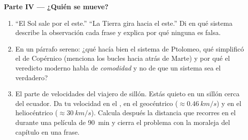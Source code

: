 \begin{problem}
\medskip
\noindent\textbf{Parte IV --- ¿Quién se mueve?}
\begin{enumerate}[resume]
  \item ``El Sol sale por el este.'' ``La Tierra gira hacia el este.''
        Di en qué sistema describe la observación cada frase y explica
        por qué ninguna es falsa.
  \item En un párrafo sereno: ¿qué hacía bien el sistema de Ptolomeo,
        qué simplificó el de Copérnico (menciona los bucles hacia atrás
        de Marte) y por qué el veredicto moderno habla de
        \emph{comodidad} y no de que un sistema sea el verdadero?
  \item El parte de velocidades del viajero de sillón. Estás quieto en
        un sillón cerca del ecuador. Da tu velocidad en el , en el geocéntrico ($\approx \qty{0.46}{km/s}$) y en
        el heliocéntrico ($\approx \qty{30}{km/s}$). Calcula después la
        distancia que recorres en el  durante una
        película de \qty{90}{min} y cierra el problema con la moraleja
        del capítulo en una frase.
\end{enumerate}
\end{problem}
